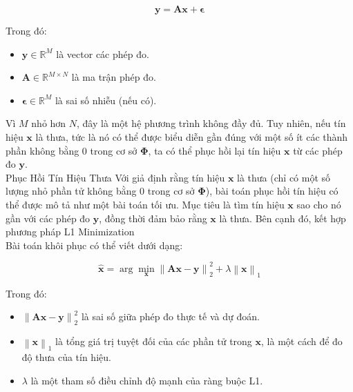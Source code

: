 \documentclass{article}
\begin{document}
\[
\mathbf{y} = \mathbf{A} \mathbf{x} + \boldsymbol{\epsilon}
\]

Trong đó:
\begin{itemize}
  \item \( \mathbf{y} \in \mathbb{R}^M \) là vector các phép đo.
  \item \( \mathbf{A} \in \mathbb{R}^{M \times N} \) là ma trận phép đo.
  \item \( \boldsymbol{\epsilon} \in \mathbb{R}^M \) là sai số nhiễu (nếu có).
\end{itemize}

Vì \( M \) nhỏ hơn \( N \), đây là một hệ phương trình không đầy đủ. Tuy nhiên, nếu tín hiệu \( \mathbf{x} \) là thưa, tức là nó có thể được biểu diễn gần đúng với một số ít các thành phần không bằng 0 trong cơ sở \( \mathbf{\Phi} \), ta có thể phục hồi lại tín hiệu \( \mathbf{x} \) từ các phép đo \( \mathbf{y} \).\\

 Phục Hồi Tín Hiệu Thưa
Với giả định rằng tín hiệu \( \mathbf{x} \) là thưa (chỉ có một số lượng nhỏ phần tử không bằng 0 trong cơ sở \( \mathbf{\Phi} \)), bài toán phục hồi tín hiệu có thể được mô tả như một bài toán tối ưu. Mục tiêu là tìm tín hiệu \( \mathbf{x} \) sao cho nó gần với các phép đo \( \mathbf{y} \), đồng thời đảm bảo rằng \( \mathbf{x} \) là thưa. Bên cạnh đó, kết hợp phương pháp L1 Minimization\\

Bài toán khôi phục có thể viết dưới dạng:

\[
\hat{\mathbf{x}} = \arg \min_{\mathbf{x}} \left\| \mathbf{A} \mathbf{x} - \mathbf{y} \right\|_2^2 + \lambda \left\| \mathbf{x} \right\|_1
\]

Trong đó:
\begin{itemize}
 \item \( \left\| \mathbf{A} \mathbf{x} - \mathbf{y} \right\|_2^2 \) là sai số giữa phép đo thực tế và dự đoán.
  \item \( \left\| \mathbf{x} \right\|_1 \) là tổng giá trị tuyệt đối của các phần tử trong \( \mathbf{x} \), là một cách để đo độ thưa của tín hiệu.
  \item \( \lambda \) là một tham số điều chỉnh độ mạnh của ràng buộc L1.
\end{itemize}
\end{document}
